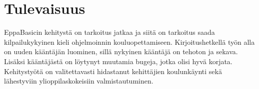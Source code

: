 \section{Tulevaisuus}
EppaBasicin kehitystä on tarkoitus jatkaa
ja siitä on tarkoitus saada kilpailukykyinen kieli
ohjelmoinnin kouluopettamiseen.
Kirjoitushetkellä työn alla on uuden kääntäjän luominen,
sillä nykyinen kääntäjä on tehoton ja sekava.
Lisäksi kääntäjästä on löytynyt muutamia bugeja,
jotka olisi hyvä korjata.
Kehitystyötä on valitettavasti hidastanut kehittäjien koulunkäynti
sekä lähestyviin ylioppilaskokeisiin valmistautuminen.
